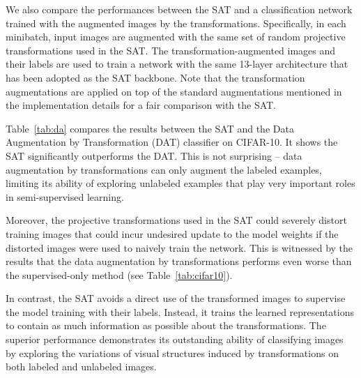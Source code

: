 \documentclass[10pt,journal,compsoc,twoside]{IEEEtran}
\begin{document}
We also compare the performances between the SAT and a classification network trained with the augmented images by the transformations.
Specifically, in each minibatch, input images are augmented with the same set of random projective transformations used in the SAT. The transformation-augmented images and their labels are used to train a network with the same 13-layer architecture that has been adopted as the SAT backbone. Note that the transformation augmentations are applied on top of the standard augmentations mentioned in the implementation details for a fair comparison with the SAT.


Table~\ref{tab:da} compares the results between the SAT and the Data Augmentation by Transformation (DAT) classifier on CIFAR-10. It shows the SAT significantly outperforms the DAT. This is not surprising -- data augmentation by transformations can only augment the labeled examples, limiting its ability of exploring unlabeled examples that play very important roles in semi-supervised learning.



Moreover, the projective transformations used in the SAT could severely distort training images that could incur undesired update to the model weights if the distorted images were used to naively train the network. This is witnessed by the results that the data augmentation by transformations performs even worse than the supervised-only method (see Table~\ref{tab:cifar10}).


In contrast, the SAT avoids a direct use of the transformed images to supervise the model training with their labels. Instead, it trains the learned representations to contain as much information as possible about the transformations. The superior performance demonstrates its outstanding ability of classifying images by exploring the variations of visual structures induced by transformations on both labeled and unlabeled images.
\end{document}
